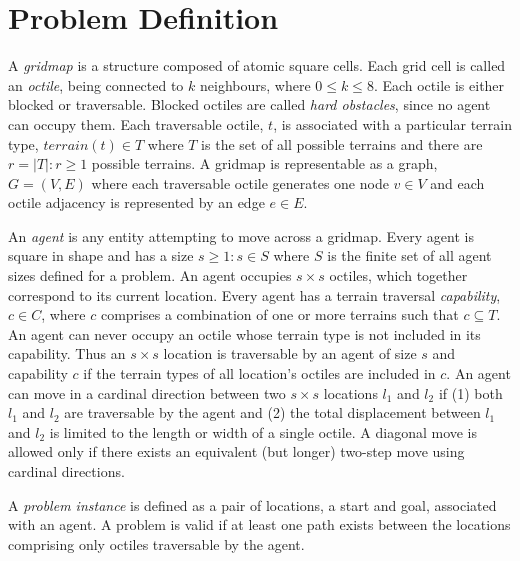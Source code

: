 \section{Problem Definition}
A \emph{gridmap} is a structure composed of atomic square cells.
Each grid cell is called an \emph{octile}, being connected to $k$ neighbours, where  $0 \leq k \leq 8$. 
Each octile is either blocked or traversable. 
Blocked octiles are called \emph{hard obstacles}, since no agent can occupy them.
Each traversable octile, $t$, is associated with a particular terrain type, $terrain(t) \in T$ where $T$ is the set of all possible terrains and there are $r = |T| : r \geq 1$ possible terrains.
A gridmap is representable as a graph, $G = (V, E)$ where each traversable octile generates one node $v \in V$ and each octile adjacency is represented by an edge $e \in E$.
\par \indent
An \emph{agent} is any entity attempting to move across a gridmap. 
Every agent is square in shape and has a size $s \geq 1 : s \in S$ where $S$ is the finite set of all agent sizes defined for a problem.
An agent occupies $s \times s$ octiles, which together correspond to its current location. 
Every agent has a terrain traversal \emph{capability}, $c \in C$, where $c$ comprises a combination of one or more terrains such that $c \subseteq T$.
An agent can never occupy an octile whose terrain type is not included in its capability.
Thus an $s \times s$ location is traversable by an agent of size $s$ and capability $c$ if the terrain types of all location's octiles are included in $c$.
An agent can move in a cardinal direction between two $s \times s$ locations $l_1$ and $l_2$ if (1) both $l_1$ and $l_2$ are traversable by the agent and (2) the total displacement between $l_1$ and $l_2$ is limited to the length or width of a single octile. 
A diagonal move is allowed only if there exists an equivalent (but longer) two-step move using cardinal directions.
\par \indent
A \emph{problem instance} is defined as a pair of locations, a start and goal, associated with an agent. A problem is valid if at least one path exists between the locations comprising only octiles traversable by the agent. 
